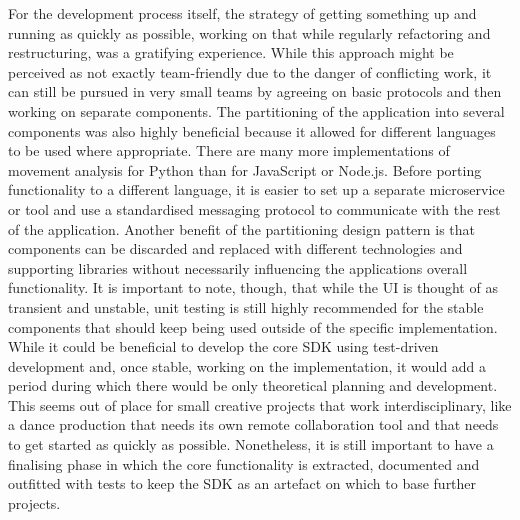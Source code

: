 For the development process itself, the strategy of getting something up and running as quickly as possible, working on that while regularly refactoring and restructuring, was a gratifying experience.
While this approach might be perceived as not exactly team-friendly due to the danger of conflicting work, it can still be pursued in very small teams by agreeing on basic protocols and then working on separate components.
The partitioning of the application into several components was also highly beneficial because it allowed for different languages to be used where appropriate.
There are many more implementations of movement analysis for Python than for JavaScript or Node.js.
Before porting functionality to a different language, it is easier to set up a separate microservice or tool and use a standardised messaging protocol to communicate with the rest of the application.
Another benefit of the partitioning design pattern is that components can be discarded and replaced with different technologies and supporting libraries without necessarily influencing the application\textquotesingle s overall functionality.
It is important to note, though, that while the \ac{UI} is thought of as transient and unstable, unit testing is still highly recommended for the stable components that should keep being used outside of the specific implementation.
While it could be beneficial to develop the core \ac{SDK} using test-driven development and, once stable, working on the implementation, it would add a period during which there would be only theoretical planning and development.
This seems out of place for small creative projects that work interdisciplinary, like a dance production that needs its own remote collaboration tool and that needs to get started as quickly as possible.
Nonetheless, it is still important to have a finalising phase in which the core functionality is extracted, documented and outfitted with tests to keep the \ac{SDK} as an artefact on which to base further projects.
